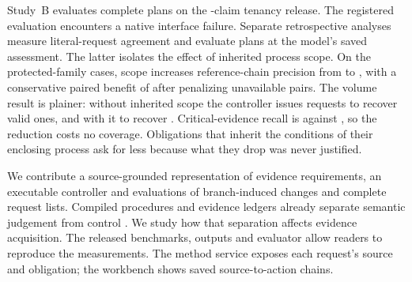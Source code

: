 Study~B evaluates complete plans on the \nbClaims-claim tenancy release.
The registered evaluation encounters a native interface failure. Separate
retrospective analyses measure literal-request agreement and evaluate plans
at the model's saved assessment. The latter isolates the effect of inherited
process scope. On the \nbHidClaims{} protected-family cases, scope increases
reference-chain precision from \asHidLsChain{} to \asHidCpChain, with a
conservative paired benefit of \asHidCChain{} after penalizing unavailable
pairs. The volume result is plainer: without inherited scope the controller
issues \asHidLsReq{} requests to recover \asHidLsValid{} valid ones, and with
it \asHidCpReq{} to recover \asHidCpValid. Critical-evidence recall is
\asHidCpCrit{} against \asHidLsCrit, so the reduction costs no coverage.
Obligations that inherit the conditions of their enclosing process ask for
less because what they drop was never justified.

We contribute a source-grounded representation of evidence requirements,
an executable controller and evaluations of branch-induced changes and
complete request lists. Compiled procedures and evidence ledgers already
separate semantic judgement from control
\citep{kim2026evidenceobligation,yu2026compile}. We study how that separation
affects evidence acquisition. The released benchmarks, outputs and evaluator
allow readers to reproduce the measurements. The method service exposes each
request's source and obligation; the workbench shows saved source-to-action
chains.
